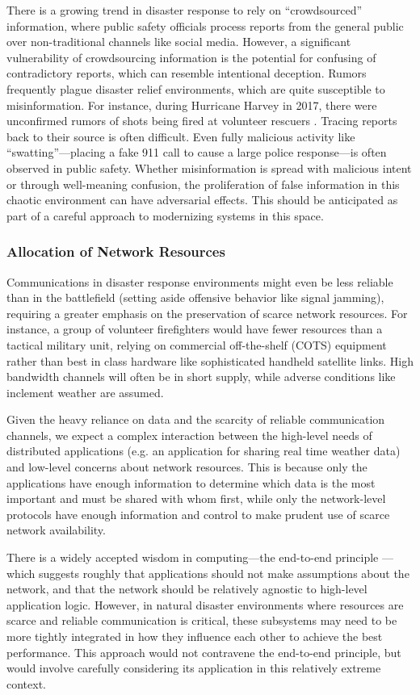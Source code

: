 \documentclass[]             %
{NASA}                       %
\theoremstyle{definition}
\begin{document}
There is a growing trend in disaster response to rely on
``crowdsourced'' information, where public safety officials process
reports from the general public over non-traditional channels like
social media. However, a significant vulnerability of crowdsourcing
information is the potential for confusing of contradictory reports,
which can resemble intentional deception. Rumors frequently plague
disaster relief environments, which are quite susceptible to
misinformation. For instance, during Hurricane Harvey in 2017, there
were unconfirmed rumors of shots being fired at volunteer rescuers
\cite{2017:cajun-navy-rumors}. Tracing reports back to their source is
often difficult. Even fully malicious activity like
``swatting''---placing a fake 911 call to cause a large police
response---is often observed in public safety. Whether misinformation
is spread with malicious intent or through well-meaning confusion, the
proliferation of false information in this chaotic environment can
have adversarial effects. This should be anticipated as part of a
careful approach to modernizing systems in this space.

\subsubsection{Allocation of Network Resources}
Communications in disaster response environments might even be less
reliable than in the battlefield (setting aside offensive behavior
like signal jamming), requiring a greater emphasis on the preservation
of scarce network resources. For instance, a group of volunteer
firefighters would have fewer resources than a tactical military unit,
relying on commercial off-the-shelf (COTS) equipment rather than best
in class hardware like sophisticated handheld satellite links. High
bandwidth channels will often be in short supply, while adverse
conditions like inclement weather are assumed.

Given the heavy reliance on data and the scarcity of reliable
communication channels, we expect a complex interaction between the
high-level needs of distributed applications (e.g. an application for
sharing real time weather data) and low-level concerns about network
resources. This is because only the applications have enough
information to determine which data is the most important and must be
shared with whom first, while only the network-level protocols have
enough information and control to make prudent use of scarce network
availability.

There is a widely accepted wisdom in computing---the end-to-end
principle \cite{1984:end-to-end}---which suggests roughly that
applications should not make assumptions about the network, and that
the network should be relatively agnostic to high-level application
logic. However, in natural disaster environments where resources are
scarce and reliable communication is critical, these subsystems may
need to be more tightly integrated in how they influence each other to
achieve the best performance. This approach would not contravene the
end-to-end principle, but would involve carefully considering its
application in this relatively extreme context.
\end{document}
